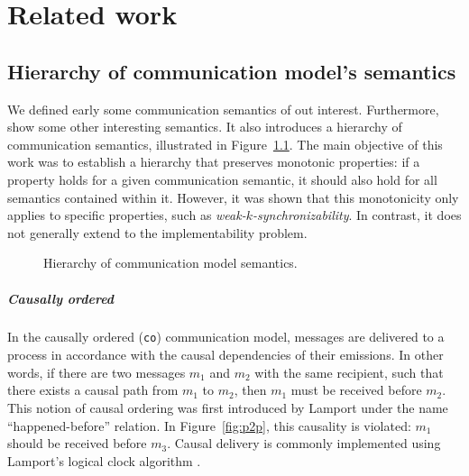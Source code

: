 
\chapter{Related work}\label{sec:rel}

\section{Hierarchy of communication model's semantics}\label{sec:hier}
We defined early some communication semantics of out interest.
Furthermore, \cite{di2023partial} show some other interesting 
semantics. It also introduces a hierarchy of communication
semantics, illustrated in Figure~\ref{fig:coms}. The main objective of
this work was to establish a hierarchy that preserves monotonic
properties: if a property holds for a given communication semantic, it
should also hold for all semantics contained within it. However, it was
shown that this monotonicity only applies to specific properties, such
as \emph{weak-$k$-synchronizability}. In contrast, it does not generally
extend to the implementability problem.


\begin{figure}[!ht]
\centering
{}
\caption{Hierarchy of communication model semantics.}
\label{fig:coms}
\end{figure}


\paragraph{Causally ordered}
In the causally ordered (\verb|co|) communication model, messages are delivered 
to a process in accordance with the causal dependencies of their emissions. 
In other words, if there are two messages $m_1$ and $m_2$ with the same recipient, 
such that there exists a causal path from $m_1$ to $m_2$, then $m_1$ must be received 
before $m_2$. This notion of causal ordering was first introduced by Lamport under the 
name ``happened-before'' relation. In Figure~\ref{fig:p2p}, this 
causality is violated: $m_1$ should be received before $m_3$. Causal delivery 
is commonly implemented using Lamport's logical clock algorithm \cite{lamport2019time}.

